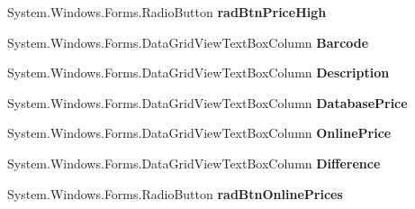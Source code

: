 \begin{DoxyCompactItemize}
\item 
\hypertarget{class_price_comparison_form_1_1_form_price_compare_a99fd4954031eebc1a83b34a28e6f01d4}{System.\-Windows.\-Forms.\-Radio\-Button {\bfseries rad\-Btn\-Price\-High}}\label{class_price_comparison_form_1_1_form_price_compare_a99fd4954031eebc1a83b34a28e6f01d4}

\item 
\hypertarget{class_price_comparison_form_1_1_form_price_compare_aa2df431cf8af56e9d0976dda85f93673}{System.\-Windows.\-Forms.\-Data\-Grid\-View\-Text\-Box\-Column {\bfseries Barcode}}\label{class_price_comparison_form_1_1_form_price_compare_aa2df431cf8af56e9d0976dda85f93673}

\item 
\hypertarget{class_price_comparison_form_1_1_form_price_compare_ad161acc833f387b79b9bf7719cc12cb1}{System.\-Windows.\-Forms.\-Data\-Grid\-View\-Text\-Box\-Column {\bfseries Description}}\label{class_price_comparison_form_1_1_form_price_compare_ad161acc833f387b79b9bf7719cc12cb1}

\item 
\hypertarget{class_price_comparison_form_1_1_form_price_compare_a3a51ed97b5338aac6488cb30f3a1c3a0}{System.\-Windows.\-Forms.\-Data\-Grid\-View\-Text\-Box\-Column {\bfseries Database\-Price}}\label{class_price_comparison_form_1_1_form_price_compare_a3a51ed97b5338aac6488cb30f3a1c3a0}

\item 
\hypertarget{class_price_comparison_form_1_1_form_price_compare_a9265c4c0e378ee2ab5e8ada0864a8235}{System.\-Windows.\-Forms.\-Data\-Grid\-View\-Text\-Box\-Column {\bfseries Online\-Price}}\label{class_price_comparison_form_1_1_form_price_compare_a9265c4c0e378ee2ab5e8ada0864a8235}

\item 
\hypertarget{class_price_comparison_form_1_1_form_price_compare_a3d0100844b1bd79ac001e9637a495fd1}{System.\-Windows.\-Forms.\-Data\-Grid\-View\-Text\-Box\-Column {\bfseries Difference}}\label{class_price_comparison_form_1_1_form_price_compare_a3d0100844b1bd79ac001e9637a495fd1}

\item 
\hypertarget{class_price_comparison_form_1_1_form_price_compare_a6d066c57f17e6984b6b6dd0af54ee027}{System.\-Windows.\-Forms.\-Radio\-Button {\bfseries rad\-Btn\-Online\-Prices}}\label{class_price_comparison_form_1_1_form_price_compare_a6d066c57f17e6984b6b6dd0af54ee027}

\end{DoxyCompactItemize}


